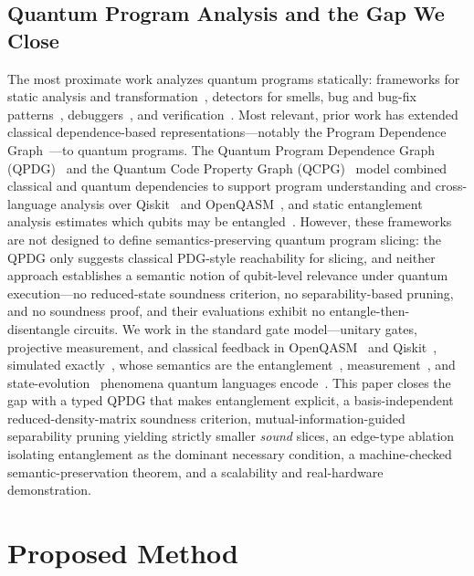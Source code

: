 \documentclass[10pt,conference]{IEEEtran}
\theoremstyle{definition}
\begin{document}
\subsection{Quantum Program Analysis and the Gap We Close}
The most proximate work analyzes quantum programs statically: frameworks for static analysis and transformation~\cite{behler2025static, behler2024supporting}, detectors for smells, bug and bug-fix patterns~\cite{chen2023smelly, zhao2021bugpatterns, nayak2023qpac, zhao2023qchecker, paltenghi2024lintq}, debuggers~\cite{metwalli2022debugging}, and verification~\cite{cho2026verifying, salam2024quantum}. Most relevant, prior work has extended classical dependence-based representations---notably the Program Dependence Graph~\cite{ferrante1987pdg}---to quantum programs. The Quantum Program Dependence Graph (QPDG)~\cite{yu2025qpdg} and the Quantum Code Property Graph (QCPG)~\cite{kaul2023uniform} model combined classical and quantum dependencies to support program understanding and cross-language analysis over Qiskit~\cite{qiskit2025} and OpenQASM~\cite{cross2022openqasm3}, and static entanglement analysis estimates which qubits may be entangled~\cite{xia2025entanglement}. However, these frameworks are not designed to define semantics-preserving quantum program slicing: the QPDG only suggests classical PDG-style reachability for slicing, and neither approach establishes a semantic notion of qubit-level relevance under quantum execution---no reduced-state soundness criterion, no separability-based pruning, and no soundness proof, and their evaluations exhibit no entangle-then-disentangle circuits. We work in the standard gate model---unitary gates, projective measurement, and classical feedback in OpenQASM~\cite{cross2022openqasm3} and Qiskit~\cite{qiskit2025}, simulated exactly~\cite{ibm2024qasmsim}, whose semantics are the entanglement~\cite{horodecki2009entanglement}, measurement~\cite{gong2023learning}, and state-evolution~\cite{nielsen2010quantum} phenomena quantum languages encode~\cite{heim2020quantum, hundt2022quantum, danos2007distributed}. This paper closes the gap with a typed QPDG that makes entanglement explicit, a basis-independent reduced-density-matrix soundness criterion, mutual-information-guided separability pruning yielding strictly smaller \emph{sound} slices, an edge-type ablation isolating entanglement as the dominant necessary condition, a machine-checked semantic-preservation theorem, and a scalability and real-hardware demonstration.

\section{Proposed Method}\label{sec:design}
\label{sec:method}
\end{document}
